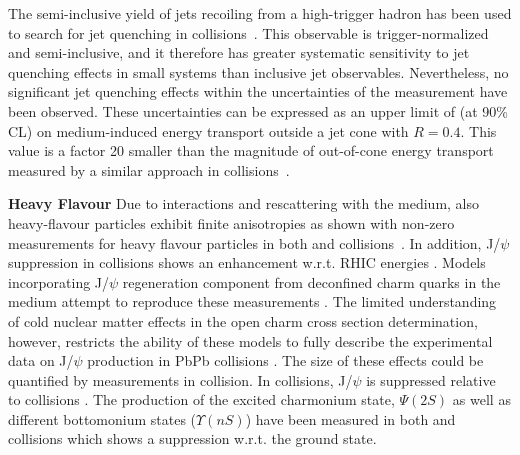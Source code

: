 \documentclass[../report.tex]{subfiles}
\begin{document}
The semi-inclusive yield of jets recoiling from a high-\pT trigger hadron has been used to search for jet quenching in \pPb collisions~\cite{Acharya:2017okq}. This observable is trigger-normalized and semi-inclusive, and it therefore has greater systematic sensitivity to jet quenching effects in small systems than inclusive jet observables. Nevertheless, no significant jet quenching effects within the uncertainties of the measurement have been observed. These uncertainties can be expressed as an upper limit of \unit[400]{\UMeV} (at 90\% CL) on medium-induced energy transport outside a jet cone with $R=0.4$. This value is a factor 20 smaller than the magnitude of out-of-cone energy transport measured by a similar approach in \PbPb collisions~\cite{Adam:2015doa}.

\textbf{Heavy Flavour}
Due to interactions and rescattering with the medium, also heavy-flavour particles exhibit finite anisotropies as shown with non-zero \vtwo measurements for heavy flavour particles in both \PbPb and \pPb collisions~\cite{ALICE:2013xna,Abelev:2013lca,Abelev:2014ipa,Adam:2015pga,Acharya:2017tfn,Adam:2016ssk,ALICE:2016clc,Acharya:2017qps,Sirunyan:2017plt,Acharya:2017tgv,Khachatryan:2016ypw,Acharya:2018dxy,Sirunyan:2018toe}. In addition, J/$\psi$ suppression in \PbPb collisions shows an enhancement w.r.t. RHIC energies \cite{Adam:2015isa}. Models incorporating J/$\psi$ regeneration component from deconfined charm quarks in the medium attempt to reproduce these measurements \cite{Abelev:2012rv,Adam:2015isa}. The limited understanding of cold nuclear matter effects in the open charm cross section determination, however, restricts the ability of these models to fully describe the experimental data on J/$\psi$ production in PbPb collisions \cite{Aaij:2017cqq}. The size of these effects could be quantified by measurements in \pPb collision. In \pPb collisions, J/$\psi$ is suppressed relative to \pp collisions \cite{Aaij:2017cqq}. The production of the excited charmonium state, $\Psi(2S)$ as well as different bottomonium states ($\Upsilon(nS)$) have been measured in both \PbPb and \pPb collisions \cite{Adam:2016ohd,Adam:2015isa,Aaboud:2017cif,Sirunyan:2016znt,Khachatryan:2016xxp} which shows a suppression w.r.t. the ground state. 
\end{document}
